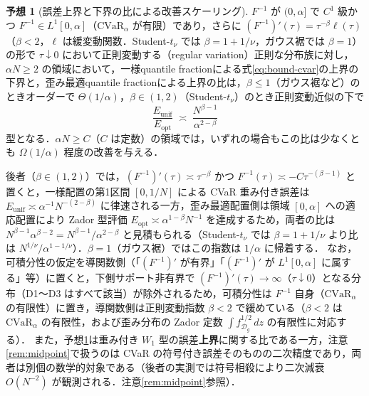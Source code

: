 \documentclass[a4paper,10pt]{jsarticle}
\theoremstyle{definition}
\newtheorem{conjecture}{予想}[section]
\newcommand{\CVaR}{\mathrm{CVaR}}
\newcommand{\Wone}{W_1}
\newcommand{\Finv}{F^{-1}}
\begin{document}
\begin{conjecture}[誤差上界と下界の比による改善スケーリング]
\label{conj:alpha}
$\Finv$ が $(0,\alpha]$ で $C^1$ 級かつ $\Finv\in L^1[0,\alpha]$（$\CVaR_\alpha$ が有限）であり，さらに $(\Finv)'(\tau)=\tau^{-\beta}\ell(\tau)$（$\beta<2$，$\ell$ は緩変動関数．Student-$t_\nu$ では $\beta=1+1/\nu$，ガウス裾では $\beta=1$）の形で $\tau\downarrow0$ において正則変動する（regular variation）正則な分布族に対し，$\alpha N\ge2$ の領域において，一様quantile fractionによる式\eqref{eq:bound-cvar}の上界の下界と，歪み最適quantile fractionによる上界の比は，$\beta\le1$（ガウス裾など）のときオーダーで $\Theta(1/\alpha)$，$\beta\in(1,2)$（Student-$t_\nu$）のとき正則変動近似の下で
\begin{equation}
  \frac{E_{\mathrm{unif}}}{E_{\mathrm{opt}}} \;\asymp\; \frac{N^{\beta-1}}{\alpha^{2-\beta}}
  \label{eq:conj-scaling}
\end{equation}
型となる．$\alpha N\ge C$（$C$ は定数）の領域では，いずれの場合もこの比は少なくとも $\Omega(1/\alpha)$ 程度の改善を与える．
\end{conjecture}
後者（$\beta\in(1,2)$）では，$(\Finv)'(\tau)\asymp\tau^{-\beta}$ かつ $\Finv(\tau)\asymp -C\tau^{-(\beta-1)}$ と置くと，一様配置の第1区間 $[0,1/N]$ による CVaR 重み付き誤差は $E_{\mathrm{unif}}\asymp\alpha^{-1}N^{-(2-\beta)}$ に律速される一方，歪み最適配置側は領域 $[0,\alpha]$ への適応配置により Zador 型評価 $E_{\mathrm{opt}}\asymp\alpha^{1-\beta}N^{-1}$ を達成するため，両者の比は $N^{\beta-1}\alpha^{\beta-2}=N^{\beta-1}/\alpha^{2-\beta}$ と見積もられる（Student-$t_\nu$ では $\beta=1+1/\nu$ より比は $N^{1/\nu}/\alpha^{1-1/\nu}$）．$\beta=1$（ガウス裾）ではこの指数は $1/\alpha$ に帰着する．
なお，可積分性の仮定を導関数側（「$(\Finv)'$ が有界」「$(\Finv)'$ が $L^1[0,\alpha]$ に属する」等）に置くと，下側サポート非有界で $(\Finv)'(\tau)\to\infty$（$\tau\downarrow0$）となる分布（D1〜D3 はすべて該当）が除外されるため，可積分性は $\Finv$ 自身（$\CVaR_\alpha$ の有限性）に置き，導関数側は正則変動指数 $\beta<2$ で緩めている（$\beta<2$ は $\CVaR_\alpha$ の有限性，および歪み分布の Zador 定数 $\int f_{\mathcal D_g}^{1/2}\,dz$ の有限性に対応する）．
また，予想\ref{conj:alpha}は重み付き $\Wone$ 型の誤差\textbf{上界}に関する比である一方，注意\ref{rem:midpoint}で扱うのは CVaR の符号付き誤差そのものの二次精度であり，両者は別個の数学的対象である（後者の実測では符号相殺により二次減衰 $O(N^{-2})$ が観測される．注意\ref{rem:midpoint}参照）．
\end{document}
